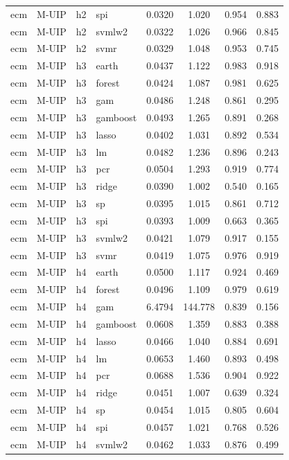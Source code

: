 \begin{ThreePartTable}
\begin{longtable}[t]{llclcccc}
ecm & M-UIP & h2 & spi & 0.0320 & 1.020 & 0.954 & 0.883\\
ecm & M-UIP & h2 & svmlw2 & 0.0322 & 1.026 & 0.966 & 0.845\\
ecm & M-UIP & h2 & svmr & 0.0329 & 1.048 & 0.953 & 0.745\\
\addlinespace
ecm & M-UIP & h3 & earth & 0.0437 & 1.122 & 0.983 & 0.918\\
ecm & M-UIP & h3 & forest & 0.0424 & 1.087 & 0.981 & 0.625\\
ecm & M-UIP & h3 & gam & 0.0486 & 1.248 & 0.861 & 0.295\\
ecm & M-UIP & h3 & gamboost & 0.0493 & 1.265 & 0.891 & 0.268\\
ecm & M-UIP & h3 & lasso & 0.0402 & 1.031 & 0.892 & 0.534\\
ecm & M-UIP & h3 & lm & 0.0482 & 1.236 & 0.896 & 0.243\\
ecm & M-UIP & h3 & pcr & 0.0504 & 1.293 & 0.919 & 0.774\\
ecm & M-UIP & h3 & ridge & 0.0390 & 1.002 & 0.540 & 0.165\\
ecm & M-UIP & h3 & sp & 0.0395 & 1.015 & 0.861 & 0.712\\
ecm & M-UIP & h3 & spi & 0.0393 & 1.009 & 0.663 & 0.365\\
ecm & M-UIP & h3 & svmlw2 & 0.0421 & 1.079 & 0.917 & 0.155\\
ecm & M-UIP & h3 & svmr & 0.0419 & 1.075 & 0.976 & 0.919\\
\addlinespace
ecm & M-UIP & h4 & earth & 0.0500 & 1.117 & 0.924 & 0.469\\
ecm & M-UIP & h4 & forest & 0.0496 & 1.109 & 0.979 & 0.619\\
ecm & M-UIP & h4 & gam & 6.4794 & 144.778 & 0.839 & 0.156\\
ecm & M-UIP & h4 & gamboost & 0.0608 & 1.359 & 0.883 & 0.388\\
ecm & M-UIP & h4 & lasso & 0.0466 & 1.040 & 0.884 & 0.691\\
ecm & M-UIP & h4 & lm & 0.0653 & 1.460 & 0.893 & 0.498\\
ecm & M-UIP & h4 & pcr & 0.0688 & 1.536 & 0.904 & 0.922\\
ecm & M-UIP & h4 & ridge & 0.0451 & 1.007 & 0.639 & 0.324\\
ecm & M-UIP & h4 & sp & 0.0454 & 1.015 & 0.805 & 0.604\\
ecm & M-UIP & h4 & spi & 0.0457 & 1.021 & 0.768 & 0.526\\
ecm & M-UIP & h4 & svmlw2 & 0.0462 & 1.033 & 0.876 & 0.499\\

\end{longtable}
\end{ThreePartTable}
